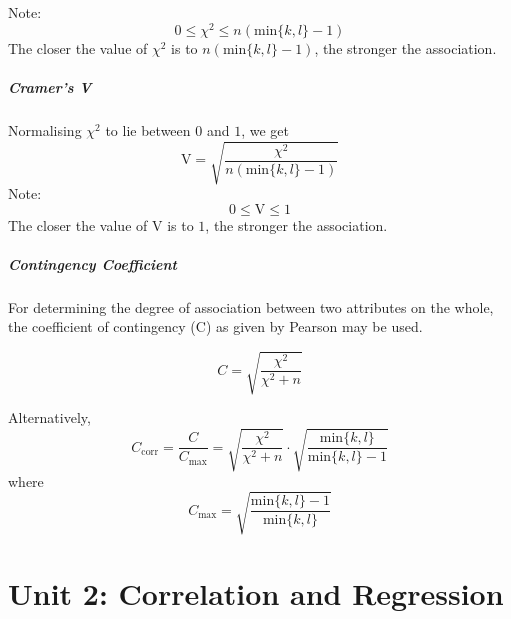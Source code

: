 \documentclass[
10pt, %
a4paper, %
]{report}
\begin{document}
Note:
\[ 0 \le \chi^2 \le n(\mathrm{min}\{k, l\}-1) \]
The closer the value of \(\chi^2\) is to \(n(\mathrm{min}\{k, l\}-1)\), the stronger the association.

\paragraph*{Cramer's V}
Normalising \(\chi^2\) to lie between \(0\) and \(1\), we get
\[
\mathrm{V} = \sqrt{\frac{\chi^2}{n(\mathrm{min}\{k, l\}-1)}}
\]
Note:
\[0 \le \mathrm{V} \le 1\]
The closer the value of V is to \(1\), the stronger the association.

\paragraph*{Contingency Coefficient}
For determining the degree of association between two attributes on the whole, the coefficient of contingency (C) as given by Pearson may be used.

\[
C = \sqrt{\frac{\chi^2}{\chi^2+n}}
\]

Alternatively,
\[
C_\mathrm{corr} = \frac{C}{C_\mathrm{max}} = \sqrt{\frac{\chi^2}{\chi^2+n}} \cdot \sqrt{\frac{\mathrm{min}\{k, l\}}{\mathrm{min}\{k, l\}-1}}
\]
where
\[
C_\mathrm{max} = \sqrt{\frac{\mathrm{min}\{k, l\}-1}{\mathrm{min}\{k, l\}}}
\]

\chapter{Unit 2: Correlation and Regression}
\end{document}
